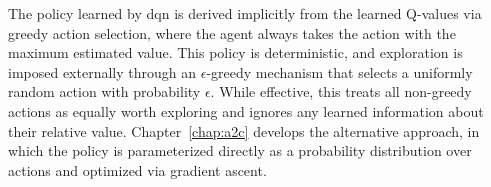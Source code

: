 The policy learned by \acrshort{dqn} is derived implicitly from the learned Q-values via greedy action selection, where the agent always takes the action with the maximum estimated value. This policy is deterministic, and exploration is imposed externally through an $\epsilon$-greedy mechanism that selects a uniformly random action with probability $\epsilon$. While effective, this treats all non-greedy actions as equally worth exploring and ignores any learned information about their relative value. Chapter~\ref{chap:a2c} develops the alternative approach, in which the policy is parameterized directly as a probability distribution over actions and optimized via gradient ascent.